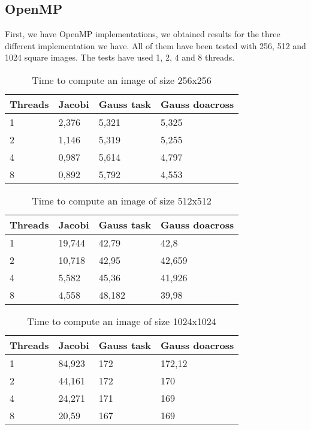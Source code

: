 \documentclass[a4paper, 10pt]{article}
\begin{document}
\subsection{OpenMP}

First, we have OpenMP implementations, we obtained results for the three different implementation we have. All of them have been tested with 256, 512 and 1024 square images. The tests have used 1, 2, 4 and 8 threads.

\begin{table}[ht]
\centering

\begin{tabular}{l|lll} 
\toprule
Threads & Jacobi & Gauss task & Gauss doacross  \\ 
\hline
1       & 2,376  & 5,321      & 5,325           \\
2       & 1,146  & 5,319      & 5,255           \\
4       & 0,987  & 5,614      & 4,797           \\
8       & 0,892  & 5,792      & 4,553           \\
\bottomrule
\end{tabular}
\caption{Time to compute an image of size 256x256}
\end{table}

\begin{table}[ht]

\centering
\begin{tabular}{l|lll} 
\toprule
Threads & Jacobi & Gauss task & Gauss doacross  \\ 
\hline
1       & 19,744 & 42,79      & 42,8            \\
2       & 10,718 & 42,95      & 42,659          \\
4       & 5,582  & 45,36      & 41,926          \\
8       & 4,558  & 48,182     & 39,98           \\
\bottomrule
\end{tabular}
\caption{Time to compute an image of size 512x512}
\end{table}

\begin{table}[ht]

\centering
\begin{tabular}{l|lll} 
\toprule
Threads & Jacobi & Gauss task & Gauss doacross  \\ 
\hline
1       & 84,923 & 172        & 172,12          \\
2       & 44,161 & 172        & 170             \\
4       & 24,271 & 171        & 169             \\
8       & 20,59  & 167        & 169             \\
\bottomrule
\end{tabular}
\caption{Time to compute an image of size 1024x1024}
\end{table}
\end{document}
